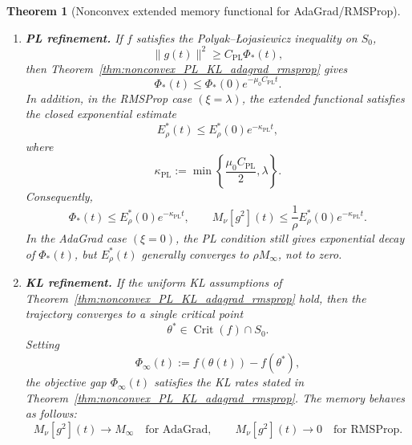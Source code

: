 \documentclass{article} %
\newtheorem{theorem}{Theorem}
\begin{document}
\begin{theorem}[Nonconvex extended memory functional for AdaGrad/RMSProp]
\begin{enumerate}
\item \textbf{PL refinement.}
If \(f\) satisfies the Polyak--{\L}ojasiewicz inequality on \(S_0\),
\[
    \|g(t)\|^2
    \geq
    C_{\mathrm{PL}}\Phi_*(t),
\]
then Theorem~\ref{thm:nonconvex_PL_KL_adagrad_rmsprop} gives
\[
    \Phi_*(t)
    \leq
    \Phi_*(0)e^{-\mu_0C_{\mathrm{PL}}t}.
\]
In addition, in the RMSProp case \((\xi=\lambda)\), the extended functional satisfies the closed exponential estimate
\[
    E_\rho^*(t)
    \leq
    E_\rho^*(0)e^{-\kappa_{\mathrm{PL}}t},
\]
where
\[
    \kappa_{\mathrm{PL}}
    :=
    \min\left\{
        \frac{\mu_0 C_{\mathrm{PL}}}{2},
        \lambda
    \right\}.
\]
Consequently,
\[
    \Phi_*(t)\leq E_\rho^*(0)e^{-\kappa_{\mathrm{PL}}t},
    \qquad
    M_\nu[g^2](t)
    \leq
    \frac{1}{\rho}E_\rho^*(0)e^{-\kappa_{\mathrm{PL}}t}.
\]
In the AdaGrad case \((\xi=0)\), the PL condition still gives exponential decay of \(\Phi_*(t)\), but \(E_\rho^*(t)\) generally converges to \(\rho M_\infty\), not to zero.

\item \textbf{KL refinement.}
If the uniform KL assumptions of Theorem~\ref{thm:nonconvex_PL_KL_adagrad_rmsprop} hold, then the trajectory converges to a single critical point
\[
    \theta^*\in\operatorname{Crit}(f)\cap S_0.
\]
Setting
\[
    \Phi_\infty(t):=f(\theta(t))-f(\theta^*),
\]
the objective gap \(\Phi_\infty(t)\) satisfies the KL rates stated in Theorem~\ref{thm:nonconvex_PL_KL_adagrad_rmsprop}. The memory behaves as follows:
\[
    M_\nu[g^2](t)\to M_\infty
    \quad\text{for AdaGrad},
    \qquad
    M_\nu[g^2](t)\to0
    \quad\text{for RMSProp}.
\]
\end{enumerate}
\end{theorem}
\end{document}
